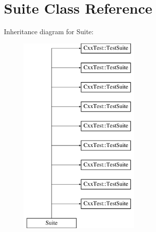 \hypertarget{classSuite}{\section{Suite Class Reference}
\label{classSuite}
}
Inheritance diagram for Suite\-:\begin{figure}[H]
\begin{center}
\leavevmode
\includegraphics[height=10.000000cm]{classSuite}
\end{center}
\end{figure}
